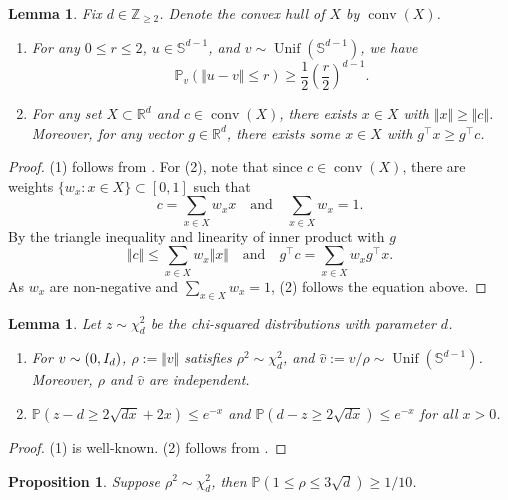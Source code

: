 \documentclass[aoap]{imsart}
\numberwithin{equation}{section}
\newtheorem{proposition}[theorem]{Proposition}
\newtheorem{lemma}[theorem]{Lemma}
\theoremstyle{definition}
\theoremstyle{remark}
\newcommand{\N}{\mathbb{N}}
\newcommand{\R}{\mathbb{R}} %
\renewcommand{\hat}{\widehat}
\numberwithin{equation}{section}
\renewcommand{\S}{\mathbb{S}}
\newcommand{\0}{\mathbf{0}}
\newcommand{\1}{\mathbf{1}}
\renewcommand{\P}{\mathbb{P}}
\renewcommand{\S}{\mathbb{S}}
\DeclareMathOperator{\Unif}{Unif}
\let \N \relax
\DeclareMathOperator{\N}{N}
\DeclareMathOperator{\conv}{conv}
\numberwithin{equation}{section}
\begin{document}
\begin{lemma}\label{lem:geo lm}
Fix $d \in \mathbb{Z}_{\geq 2}$. Denote the convex hull of $X$ by $\conv(X)$.
\begin{enumerate}
\item For any $0\leq r\leq 2$, $u\in \S^{d-1}$, and $v\sim\Unif (\S^{d-1})$, we have \[\P_{v} \left(\Vert u-v\Vert \leq r\right)\geq \frac{1}{2}\left(\frac{r}{2}\right)^{d-1}.\]
\item For any set $X\subset \R^d$ and $c\in\conv(X)$, there exists $x\in X$ with $\Vert x\Vert\geq \Vert c\Vert$. Moreover, for any vector $g\in\R^d$, there exists some $x\in X$ with $g^{\intercal}x\geq g^{\intercal}c$.
\end{enumerate}
\end{lemma}
\begin{proof} 
(1) follows from \cite[Lemma 2.3]{ball1997elementary}. For (2), note that since $c\in \conv (X)$, there are weights $\lbrace w_x:x\in X\rbrace\subset [0, 1]$ such that
\[ c=\sum _{x\in X}w_xx\quad\text{and}\quad \sum_{x\in X}w_x=1.\]
By the triangle inequality and linearity of inner product with $g$
\[ \Vert c\Vert \leq \sum_{x\in X}w_x\Vert x\Vert \quad\text{and}\quad g^{\intercal}c=\sum _{x\in X}w_xg^{\intercal}x.\]
As $w_x$ are non-negative and $\sum_{x\in X}w_x= 1$, (2) follows the equation above. 
\end{proof}
\begin{lemma}\label{lem:prob lm}
Let $z\sim \chi_{d}^{2}$ be the chi-squared distributions with parameter $d$.
\begin{enumerate}
\item For $v\sim \N(0, I_{d})$, $\rho := \Vert v\Vert $ satisfies $\rho^2\sim \chi^2_{d}$, and $\hat{v}:=v/\rho\sim \Unif(\S^{d-1})$. Moreover, $\rho$ and $\hat{v}$ are independent.
\item$\P(z-d\geq 2\sqrt{dx}+2x)\leq e^{-x}$ and $\P(d-z\geq 2\sqrt{dx})\leq e^{-x}$ for all $x>0$.
\end{enumerate}
\end{lemma}
\begin{proof}
(1) is well-known. (2) follows from \cite[Lemma 1]{laurent2000adaptive}.
\end{proof}
\begin{proposition}\label{prop:chi}
Suppose $\rho^2\sim \chi^2_d$, then $\P(1\leq \rho\leq 3\sqrt{d})\geq 1/10$.
\end{proposition} 
\end{document}

